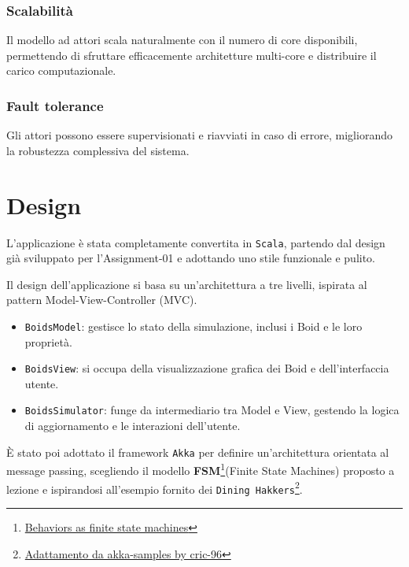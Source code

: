 \documentclass[a4paper,12pt]{report}
\begin{document}
        \subsection*{Scalabilità}
            Il modello ad attori scala naturalmente con il numero di core disponibili, permettendo di sfruttare 
            efficacemente architetture multi-core e distribuire il carico computazionale.

        \subsection*{Fault tolerance}
            Gli attori possono essere supervisionati e riavviati in caso di errore, migliorando la robustezza 
            complessiva del sistema.


\chapter{Design}

    L'applicazione è stata completamente convertita in \texttt{Scala}, partendo dal design già sviluppato per l'Assignment-01 e adottando uno stile funzionale e pulito.

    Il design dell'applicazione si basa su un'architettura a tre livelli, ispirata al pattern Model-View-Controller (MVC).
    \begin{itemize}
        \item \texttt{BoidsModel}: gestisce lo stato della simulazione, inclusi i Boid e le loro proprietà.
        \item \texttt{BoidsView}: si occupa della visualizzazione grafica dei Boid e dell'interfaccia utente.
        \item \texttt{BoidsSimulator}: funge da intermediario tra Model e View, gestendo la logica di aggiornamento e le interazioni dell'utente.
    \end{itemize}

    È stato poi adottato il framework \texttt{Akka} per definire un'architettura orientata al message passing, scegliendo il modello \textbf{FSM}\footnote{\href{https://doc.akka.io/libraries/akka-core/current/typed/fsm.html}{Behaviors as finite state machines}}(Finite State Machines) proposto a lezione e ispirandosi all'esempio fornito dei \texttt{Dining Hakkers}\footnote{\href{https://github.com/cric96/pcd-lab-akka-actors/blob/63e4f3273ef1550c1c744d1f7332b7ce935223ab/src/main/scala/it/unibo/pcd/akka/basics/e07fsm/DiningHakkers.scala}{Adattamento da akka-samples by cric-96}}.
    
\end{document}
